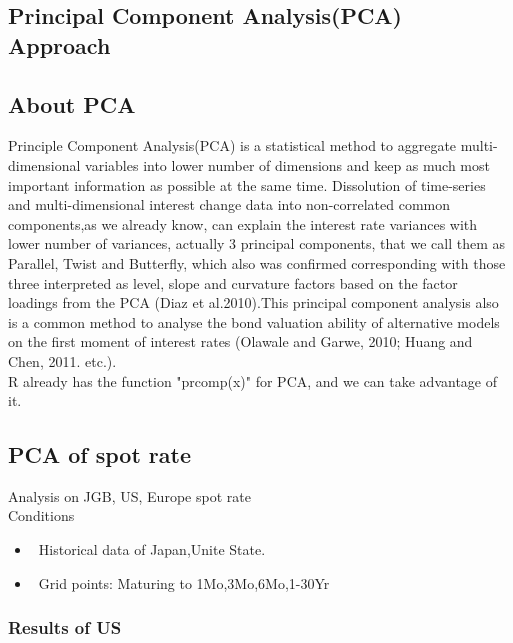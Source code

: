 \documentclass{article}
\begin{document}
\begin{spacing}{1.5}
\section{Principal Component Analysis(PCA) Approach}
\subsection{About PCA}
Principle Component Analysis(PCA) is a statistical method to aggregate multi-dimensional variables into lower number of dimensions and keep as much most important information as possible at the same time. Dissolution of time-series and multi-dimensional interest change data into non-correlated common components,as we already know, can explain the interest rate variances with lower number of variances, actually 3 principal components, that we call them as Parallel, Twist and Butterfly, which also was confirmed corresponding with those three interpreted as level, slope and curvature factors based on the factor loadings from the PCA (Diaz et al.2010).This principal component analysis also is a common method to analyse the bond valuation ability of alternative models on the first moment of interest rates (Olawale and Garwe, 2010; Huang and Chen, 2011. etc.).\\
R already has the function "prcomp(x)" for PCA, and we can take advantage of it.

\subsection{PCA of spot rate}
Analysis on JGB, US, Europe spot rate\\
Conditions\\
 \begin{itemize}
 \item\ Historical data of Japan,Unite State.
 
 \item\ Grid points:
 Maturing to  1Mo,3Mo,6Mo,1-30Yr
 \end{itemize}
\subsubsection{Results of US}




\end{spacing}
\end{document}
